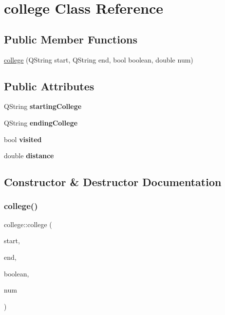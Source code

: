 \hypertarget{classcollege}{}\section{college Class Reference}
\label{classcollege}
\subsection*{Public Member Functions}
\begin{DoxyCompactItemize}
\item 
\hyperlink{classcollege_a14a1082be72591ff01ca864d92dd9887}{college} (Q\+String start, Q\+String end, bool boolean, double num)
\end{DoxyCompactItemize}
\subsection*{Public Attributes}
\begin{DoxyCompactItemize}
\item 
\mbox{\label{classcollege_a91d5c57f0cbad290347af66575fd9df8}} 
Q\+String {\bfseries starting\+College}
\item 
\mbox{\label{classcollege_a0aab2af26a9bc9a8a47b1e0040616ed1}} 
Q\+String {\bfseries ending\+College}
\item 
\mbox{\label{classcollege_a0a46d7cad4b78170248ab1f5aa1649f0}} 
bool {\bfseries visited}
\item 
\mbox{\label{classcollege_a5b5ac9a4cd0c7dd201aaddb2cc5a6c27}} 
double {\bfseries distance}
\end{DoxyCompactItemize}


\subsection{Constructor \& Destructor Documentation}
\mbox{\label{classcollege_a14a1082be72591ff01ca864d92dd9887}} 
\subsubsection{\texorpdfstring{college()}{college()}}
{\footnotesize\ttfamily college\+::college (\begin{DoxyParamCaption}\item[{Q\+String}]{start,  }\item[{Q\+String}]{end,  }\item[{bool}]{boolean,  }\item[{double}]{num }\end{DoxyParamCaption})\hspace{0.3cm}{\ttfamily [inline]}}


